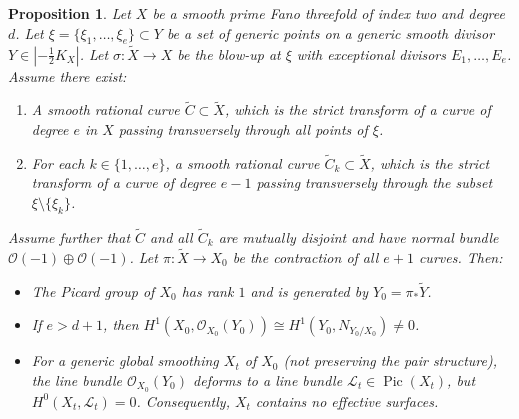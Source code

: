 \documentclass[11pt]{article}
\newtheorem{prop}[thm]{Proposition}
\theoremstyle{definition}
\newcommand{\abs}[1]{\left\vert#1\right\vert}
\newcommand{\OO}{\mathcal{O}}
\DeclareMathOperator{\Pic}{Pic}
\begin{document}
\begin{prop}\label{prop:MultDegrees}
Let $X$ be a smooth prime Fano threefold of index two and degree $d$. Let $\xi = \{\xi_1, \dots, \xi_e\} \subset Y$ be a set of generic points on a generic smooth divisor $Y \in \abs{-\frac{1}{2}K_X}$. Let $\sigma \colon \tilde{X} \to X$ be the blow-up at $\xi$ with exceptional divisors $E_1, \dots, E_e$. Assume there exist:
\begin{enumerate}
    \item A smooth rational curve $\tilde{C} \subset \tilde{X}$, which is the strict transform of a curve of degree $e$ in $X$ passing transversely through all points of $\xi$.
    \item For each $k \in \{1, \dots, e\}$, a smooth rational curve $\tilde{C}_k \subset \tilde{X}$, which is the strict transform of a curve of degree $e-1$ passing transversely through the subset $\xi \setminus \{\xi_k\}$.
\end{enumerate}
Assume further that $\tilde{C}$ and all $\tilde{C}_k$ are mutually disjoint and have normal bundle $\OO(-1) \oplus \OO(-1)$. Let $\pi \colon \tilde{X} \to X_0$ be the contraction of all $e+1$ curves. Then:
\begin{itemize}
    \item[i)] The Picard group of $X_0$ has rank $1$ and is generated by $Y_0 = \pi_*\tilde{Y}$.
    \item[ii)] If $e > d + 1$, then $H^1(X_0, \OO_{X_0}(Y_0)) \cong H^1(Y_0, N_{Y_0/X_0}) \neq 0$.
    \item[iii)] For a generic global smoothing $X_t$ of $X_0$ (not preserving the pair structure), the line bundle $\OO_{X_0}(Y_0)$ deforms to a line bundle $\mathcal{L}_t \in \Pic(X_t)$, but $H^0(X_t, \mathcal{L}_t) = 0$. Consequently, $X_t$ contains no effective surfaces.
\end{itemize}
\end{prop}
\end{document}
